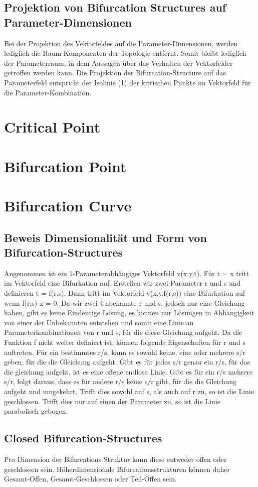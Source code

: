 \documentclass[11pt]{article}
\begin{document}
\subsection{Projektion von Bifurcation Structures auf Parameter-Dimensionen}
Bei der Projektion des Vektorfeldes auf die Parameter-Dimensionen, werden lediglich die Raum-Komponenten der Topologie entfernt. Somit bleibt lediglich der Parameterraum, in dem Aussagen über das Verhalten der Vektorfelder getroffen werden kann.
Die Projektion der Bifurcation-Structure auf das Parameterfeld entspricht der Isolinie (1) der kritischen Punkte im Vektorfeld für die Parameter-Kombination.
\section{Critical Point}
\section{Bifurcation Point}
\section{Bifurcation Curve}
\subsection{Beweis Dimensionalität und Form von Bifurcation-Structures}
Angenommen ist ein 1-Parameterabhängiges Vektorfeld v(x,y,t). Für t = x tritt im Vektorfeld eine Bifurkation auf.
Erstellen wir zwei Parameter r und s und definieren t = f(r,s). Dann tritt im Vektorfeld v(x,y,f(r,s)) eine Bifurkation auf wenn f(r,s)-x = 0. Da wir zwei Unbekannte r und s, jedoch nur eine Gleichung haben, gibt es keine Eindeutige Lösung, es können nur Lösungen in Abhängigkeit von einer der Unbekannten entstehen und somit eine Linie an Parameterkombinationen von r und s, für die diese Gleichung aufgeht.
Da die Funktion f nicht weiter definiert ist, können folgende Eigenschaften für r und s auftreten.
Für ein bestimmtes r/s, kann es sowohl keine, eine oder mehrere s/r geben, für die die Gleichung aufgeht.
Gibt es für jedes s/r genau ein r/s, für das die gleichung aufgeht, ist es eine offene endlose Linie.
Gibt es für ein r/s mehrere s/r, folgt daraus, dass es für andere r/s keine s/r gibt, für die die Gleichung aufgeht und umgekehrt. Trifft dies sowohl auf s, als auch auf r zu, so ist die Linie geschlossen. Trifft dies nur auf einen der Parameter zu, so ist die Linie parabolisch gebogen.
\subsection{Closed Bifurcation-Structures}
Pro Dimension der Bifurcations Struktur kann diese entweder offen oder geschlossen sein.
Höherdimensionale Bifurcationsstrukturen können daher Gesamt-Offen, Gesamt-Geschlossen oder Teil-Offen sein.
\end{document}
